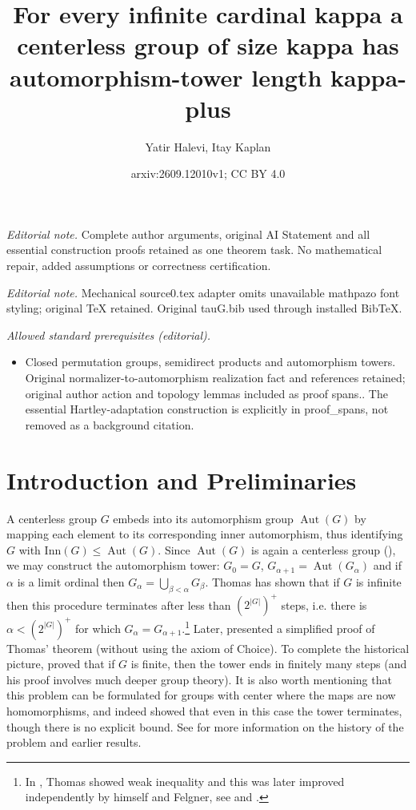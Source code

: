 \documentclass[10pt,a4paper]{amsart}
\title{For every infinite cardinal kappa a centerless group of size kappa has automorphism-tower length kappa-plus}
\author{Yatir Halevi, Itay Kaplan}
\date{arxiv:2609.12010v1; CC BY 4.0}
\theoremstyle{plain}
\theoremstyle{definition}
\newcounter{step}
\DeclareMathOperator{\aut}{Aut}
\begin{document}
\maketitle
\noindent\textit{Editorial note.} Complete author arguments, original AI Statement and all essential construction proofs retained as one theorem task. No mathematical repair, added assumptions or correctness certification.\par\medskip
\noindent\textit{Editorial note.} Mechanical source0.tex adapter omits unavailable mathpazo font styling; original TeX retained. Original tauG.bib used through installed BibTeX.\par\medskip
\noindent\textit{Allowed standard prerequisites (editorial).}\begin{itemize}
\item Closed permutation groups, semidirect products and automorphism towers. Original normalizer-to-automorphism realization fact and references retained; original author action and topology lemmas included as proof spans.. The essential Hartley-adaptation construction is explicitly in proof\_spans, not removed as a background citation.
\end{itemize}\medskip
\section{Introduction and Preliminaries}

A centerless group $G$ embeds into its automorphism group $\aut(G)$ by mapping each element to its corresponding inner automorphism, thus identifying $G$ with $\mathrm{Inn}(G)\leq \aut(G)$. Since $\aut(G)$ is again a centerless group (\cite[Lemma 1.1.1]{ThomasBook}), we may construct the  automorphism tower: $G_0=G$, $G_{\alpha+1}=\aut(G_\alpha)$ and if $\alpha$ is a limit ordinal then $G_\alpha=\bigcup_{\beta<\alpha} G_\beta$. Thomas \cite{Thomas,thomasII} has shown that if $G$ is infinite then this procedure terminates after less than $(2^{|G|})^+$ steps, i.e. there is $\alpha< (2^{|G|})^+$ for which $G_\alpha=G_{\alpha+1}$.\footnote{In \cite{Thomas}, Thomas showed weak inequality and this was later improved independently by himself and Felgner, see \cite{thomasII} and \cite[Corollary 3.3.2]{ThomasBook}.} Later, \cite{KaplanShelah882} presented a simplified proof of Thomas' theorem (without using the axiom of Choice). To complete the historical picture, \cite{Wielandt} proved that if $G$ is finite, then the tower ends in finitely many steps (and his proof involves much deeper group theory). It is also worth mentioning that this problem can be formulated for groups with center where the maps are now homomorphisms, and indeed \cite{Hamkins} showed that even in this case the tower terminates, though there is no explicit bound. 
See \cite{ThomasBook} for more information on the history of the problem and earlier results.
\end{document}
